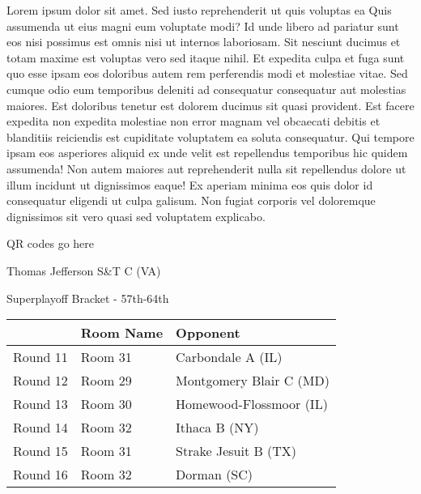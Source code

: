 \documentclass{article}%
\begin{document}
\vspace*{8pt}%
\linebreak%
\newline%
\newline%
    Lorem ipsum dolor sit amet. Sed iusto reprehenderit ut quis voluptas ea Quis assumenda ut eius magni eum voluptate modi? Id unde libero ad pariatur sunt eos nisi possimus est omnis nisi ut internos laboriosam. Sit nesciunt ducimus et totam maxime est voluptas vero sed itaque nihil. Et expedita culpa et fuga sunt quo esse ipsam eos doloribus autem rem perferendis modi et molestiae vitae.\newline%
\newline%
    Sed cumque odio eum temporibus deleniti ad consequatur consequatur aut molestias maiores. Est doloribus tenetur est dolorem ducimus sit quasi provident. Est facere expedita non expedita molestiae non error magnam vel obcaecati debitis et blanditiis reiciendis est cupiditate voluptatem ea soluta consequatur. Qui tempore ipsam eos asperiores aliquid ex unde velit est repellendus temporibus hic quidem assumenda!\newline%
\newline%
    Non autem maiores aut reprehenderit nulla sit repellendus dolore ut illum incidunt ut dignissimos eaque! Ex aperiam minima eos quis dolor id consequatur eligendi ut culpa galisum. Non fugiat corporis vel doloremque dignissimos sit vero quasi sed voluptatem explicabo.\newline%
\newline%
\vspace*{30pt}%
\begin{center}%
\begin{Huge}%
QR codes go here%
\end{Huge}%
\end{center}%
\newpage%
\begin{center}%
\begin{Huge}%
Thomas Jefferson S\&T C (VA)%
\end{Huge}%
\vspace*{8pt}%
\linebreak%
\begin{Large}%
Superplayoff Bracket {-} 57th{-}64th%
\end{Large}%
\end{center}%
%
\begin{tabularx}{\textwidth}{|c|Y|Y|}%
\hline%
&Room Name&Opponent\\%
\hline%
Round 11&Room 31&Carbondale A (IL)\\%
Round 12&Room 29&Montgomery Blair C (MD)\\%
Round 13&Room 30&Homewood{-}Flossmoor (IL)\\%
Round 14&Room 32&Ithaca B (NY)\\%
Round 15&Room 31&Strake Jesuit B (TX)\\%
Round 16&Room 32&Dorman (SC)\\%
\hline%
\end{tabularx}%
\end{document}
